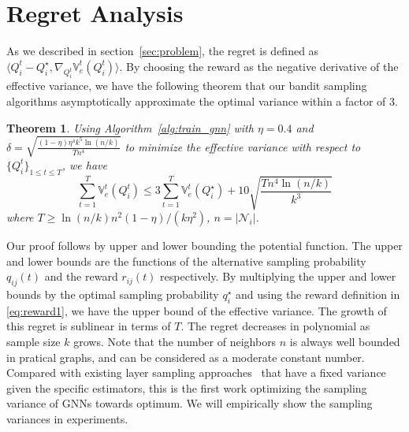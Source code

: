 \documentclass{article}
\newtheorem{theorem}{Theorem}
\begin{document}
\section{Regret Analysis}\label{sec:regret_analysis}
As we described in section~\ref{sec:problem}, the regret is defined as $\langle Q_i^t - Q_i^{\star}, 
\nabla_{Q_i^t}\mathbb{V}_e^t(Q_i^t) \rangle$. By choosing the reward as the negative derivative of the effective variance, we have the following theorem that our bandit sampling algorithms asymptotically approximate the optimal variance within a factor of 3.

\begin{theorem}
Using Algorithm~\ref{alg:train_gnn} with $\eta=0.4$ 
and $\delta=\sqrt{\frac{(1-\eta)\eta^4k^5\ln(n/k)}{Tn^4}}$ 
to minimize the effective variance with respect 
to $\{Q_{i}^t\}_{1\leq t\leq T}$, we have 
\begin{equation}
\sum_{t=1}^T\mathbb{V}_e^t(Q_i^t) \leq 3\sum_{t=1}^T\mathbb{V}_e^t(Q_i^{\star}) + 10\sqrt{\frac{Tn^4\ln(n/k)}{k^3}}
\end{equation}
where $T\geq \ln(n/k)n^2(1-\eta)/(k\eta^2)$, $n=|\mathcal{N}_i|$.
\end{theorem}
Our proof follows \cite{salehi2017stochastic} by upper and lower bounding the potential function. The upper and lower bounds are the functions of the alternative sampling probability $q_{ij}(t)$ and the reward $r_{ij}(t)$ respectively. By multiplying the upper and lower bounds by the optimal sampling probability $q_{i}^{\star}$ and using the reward definition in \eqref{eq:reward1}, we have the upper bound of the effective variance.
The growth of this regret is sublinear in terms of $T$.
The regret decreases in polynomial as sample size $k$ grows.
Note that the number
of neighbors $n$ is always well bounded in pratical graphs,
and can be considered as a moderate constant number.
Compared with existing layer sampling 
approaches~\cite{hamilton2017inductive,chen2018fastgcn,zou2019layer}
that have a fixed variance given the specific estimators, 
this is the first work optimizing the sampling
variance of GNNs towards optimum.
We will empirically show the sampling variances in experiments.
\end{document}
